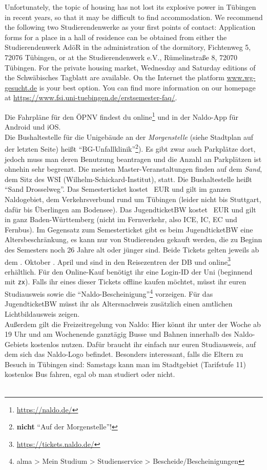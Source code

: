     Unfortunately, the topic of housing has not lost its explosive power in Tübingen in recent years,
    so that it may be difficult to find accommodation. We recommend the following two Studierendenwerke as your first points of contact:
    Application forms for a place in a hall of residence can be obtained from either the Studierendenwerk AdöR in the administration of the dormitory,
    Fichtenweg 5, 72076 Tübingen, or at the Studierendenwerk e.V., Rümelinstraße 8, 72070 Tübingen. For the private housing market, Wednesday and Saturday
    editions of the Schwäbisches Tagblatt are available.
    On the Internet the platform \url{www.wg-gesucht.de} is your best option.
    You can find more information on our homepage at \url{https://www.fsi.uni-tuebingen.de/erstsemester-faq/}.

\else

    Die Fahrpläne für den ÖPNV  findest du online\footnote{\url{https://naldo.de/}} und in der Naldo-App für Android und iOS.\\
    Die Bushaltestelle für die Unigebäude an der \emph{Morgenstelle} (siehe Stadtplan auf der letzten Seite) heißt "`BG-Unfallklinik"'\footnote{\textbf{nicht} "`Auf der Morgenstelle"'!}). Es gibt zwar auch Parkplätze dort,
    jedoch muss man deren Benutzung beantragen und die Anzahl an Parkplätzen ist ohnehin sehr begrenzt.
    \ifmaster
    Die meisten Master-Veranstaltungen finden auf dem \emph{Sand}, dem Sitz des WSI (Wilhelm-Schickard-Institut), statt. Die Bushaltestelle heißt "`Sand Drosselweg"'.
    \fi
    Das Semesterticket kostet \semesterticketpreis~EUR und gilt im ganzen Naldogebiet, dem Verkehrsverbund rund um Tübingen (leider nicht bis Stuttgart, dafür bis Überlingen am Bodensee).
    Das JugendticketBW kostet \jugendticketbwpreis~EUR und gilt in ganz Baden-Württemberg (nicht im Fernverkehr, also ICE, IC, EC und Fernbus). Im Gegensatz zum Semesterticket gibt es beim JugendticketBW eine Altersbeschränkung,
    es kann nur von Studierenden gekauft werden, die zu Beginn des Semesters noch 26 Jahre alt oder jünger sind.
    Beide Tickets gelten jeweils ab dem
    . Oktober
    \fi
    . April
    \fi
    und sind in den Reisezentren der DB und online\footnote{\url{https://tickets.naldo.de/}} erhältlich. Für den Online-Kauf benötigt ihr eine Login-ID der Uni (beginnend mit \texttt{zx}). Falls ihr eines dieser Tickets offline kaufen möchtet, müsst ihr euren Studiausweis
    sowie die "`Naldo-Bescheinigung"'\footnote{alma > Mein Studium > Studienservice > Bescheide/Bescheinigungen} vorzeigen. Für das JugendticketBW müsst ihr als Altersnachweis zusätzlich einen amtlichen Lichtbildausweis zeigen. \\
    Außerdem gilt die Freizeitregelung von Naldo: Hier könnt ihr unter der Woche ab 19 Uhr und am Wochenende ganztägig Busse und Bahnen innerhalb des Naldo-Gebiets kostenlos nutzen. Dafür braucht ihr einfach nur euren Studiausweis, auf dem sich das Naldo-Logo befindet.
    Besonders interessant, falls die Eltern zu Besuch in Tübingen sind: Samstags kann man im Stadtgebiet (Tarifstufe 11) kostenlos Bus fahren, egal ob man studiert oder nicht. \\\\

